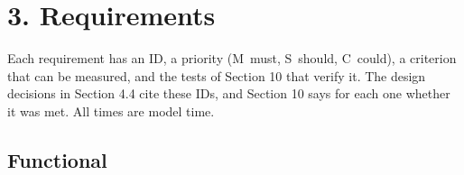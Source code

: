 \section{3. Requirements}

Each requirement has an ID, a priority (M~must, S~should, C~could), a criterion
that can be measured, and the tests of Section 10 that verify it. The design
decisions in Section 4.4 cite these IDs, and Section 10 says for each one
whether it was met. All times are model time.


\subsection{Functional}

